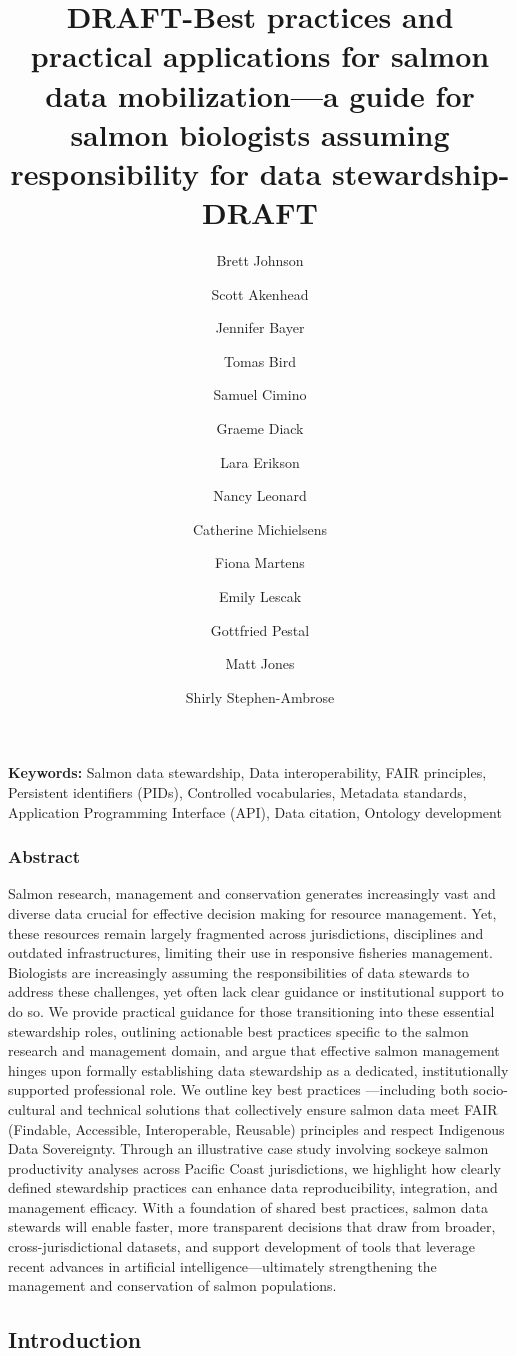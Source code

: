 \documentclass[
  letterpaper,
  DIV=11,
  numbers=noendperiod]{scrartcl}
\title{DRAFT-Best practices and practical applications for salmon data
mobilization---a guide for salmon biologists assuming responsibility for
data stewardship-DRAFT}
\author{Brett Johnson \and Scott Akenhead \and Jennifer Bayer \and Tomas
Bird \and Samuel Cimino \and Graeme Diack \and Lara Erikson \and Nancy
Leonard \and Catherine Michielsens \and Fiona Martens \and Emily
Lescak \and Gottfried Pestal \and Matt Jones \and Shirly
Stephen-Ambrose}
\date{}
\begin{document}
\maketitle


\textbf{Keywords:} Salmon data stewardship, Data interoperability, FAIR
principles, Persistent identifiers (PIDs), Controlled vocabularies,
Metadata standards, Application Programming Interface (API), Data
citation, Ontology development

\subsubsection{Abstract}\label{abstract}

Salmon research, management and conservation generates increasingly vast
and diverse data crucial for effective decision making for resource
management. Yet, these resources remain largely fragmented across
jurisdictions, disciplines and outdated infrastructures, limiting their
use in responsive fisheries management. Biologists are increasingly
assuming the responsibilities of data stewards to address these
challenges, yet often lack clear guidance or institutional support to do
so. We provide practical guidance for those transitioning into these
essential stewardship roles, outlining actionable best practices
specific to the salmon research and management domain, and argue that
effective salmon management hinges upon formally establishing data
stewardship as a dedicated, institutionally supported professional role.
We outline key best practices ---including both socio-cultural and
technical solutions that collectively ensure salmon data meet FAIR
(Findable, Accessible, Interoperable, Reusable) principles and respect
Indigenous Data Sovereignty. Through an illustrative case study
involving sockeye salmon productivity analyses across Pacific Coast
jurisdictions, we highlight how clearly defined stewardship practices
can enhance data reproducibility, integration, and management efficacy.
With a foundation of shared best practices, salmon data stewards will
enable faster, more transparent decisions that draw from broader,
cross-jurisdictional datasets, and support development of tools that
leverage recent advances in artificial intelligence---ultimately
strengthening the management and conservation of salmon populations.

\subsection{Introduction}\label{introduction}
\end{document}
